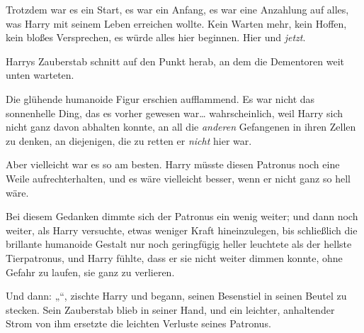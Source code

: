 Trotzdem war es ein Start, es war ein Anfang, es war eine Anzahlung auf alles, was Harry mit seinem Leben erreichen wollte. Kein Warten mehr, kein Hoffen, kein bloßes Versprechen, es würde alles hier beginnen. Hier und \emph{jetzt}.

Harrys Zauberstab schnitt auf den Punkt herab, an dem die Dementoren weit unten warteten.


Die glühende humanoide Figur erschien aufflammend. Es war nicht das sonnenhelle Ding, das es vorher gewesen war… wahrscheinlich, weil Harry sich nicht ganz davon abhalten konnte, an all die \emph{anderen} Gefangenen in ihren Zellen zu denken, an diejenigen, die zu retten er \emph{nicht} hier war.

Aber vielleicht war es so am besten. Harry müsste diesen Patronus noch eine Weile aufrechterhalten, und es wäre vielleicht besser, wenn er nicht ganz so hell wäre.

Bei diesem Gedanken dimmte sich der Patronus ein wenig weiter; und dann noch weiter, als Harry versuchte, etwas weniger Kraft hineinzulegen, bis schließlich die brillante humanoide Gestalt nur noch geringfügig heller leuchtete als der hellste Tierpatronus, und Harry fühlte, dass er sie nicht weiter dimmen konnte, ohne Gefahr zu laufen, sie ganz zu verlieren.

Und dann: „“, zischte Harry und begann, seinen Besenstiel in seinen Beutel zu stecken. Sein Zauberstab blieb in seiner Hand, und ein leichter, anhaltender Strom von ihm ersetzte die leichten Verluste seines Patronus.

